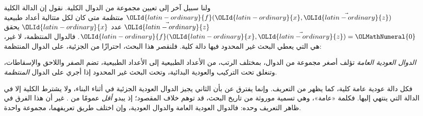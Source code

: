 \documentclass[../../../include/open-logic-section]{subfiles}
\begin{document}

ولنا سبيل آخر إلى تعيين مجموعة من الدوال الكلية. نقول إن الدالة الكلية
${\OLId{latin-ordinary}{f}}({\OLId{latin-ordinary}{x}},\vec {\OLId{latin-ordinary}{z}})$ \emph{منتظمة} متى كان لكل متتالية أعداد طبيعية
$\vec {\OLId{latin-ordinary}{z}}$ عدد ${\OLId{latin-ordinary}{x}}$ يحقق ${\OLId{latin-ordinary}{f}}({\OLId{latin-ordinary}{x}},\vec {\OLId{latin-ordinary}{z}})={\OLMathNumeral{0}}$. فالدوال المنتظمة، لا غير،
هي التي يعطي البحث غير المحدود فيها دالة
كلية. فلنقصر هذا البحث، احترازًا من الجزئية، على الدوال المنتظمة:

\begin{defn}
\emph{الدوال العودية العامة} تؤلف أصغر مجموعة من الدوال، بمختلف الرتب، من
الأعداد الطبيعية إلى الأعداد الطبيعية، تضم الصفر
واللاحق والإسقاطات، وتنغلق تحت التركيب والعودية البدائية، وتحت البحث
غير المحدود إذا أجري على الدوال \emph{المنتظمة}.
\end{defn}

فكل دالة عودية عامة كلية، كما يظهر من التعريف. وإنما يفترق
 عن  بأن
الثاني يجيز الدوال العودية الجزئية في أثناء البناء، ولا يشترط
الكلية إلا في الدالة التي ينتهي إليها. فكلمة «عامة»،
وهي تسمية موروثة من تاريخ البحث، قد توهم خلاف المقصود؛ إذ
 يبدو \emph{أقل} عمومًا من
. غير أن هذا الفرق في ظاهر التعريف وحده:
فالدوال العودية العامة والدوال العودية، وإن اختلف طريق تعريفهما،
مجموعة واحدة.
\end{document}
